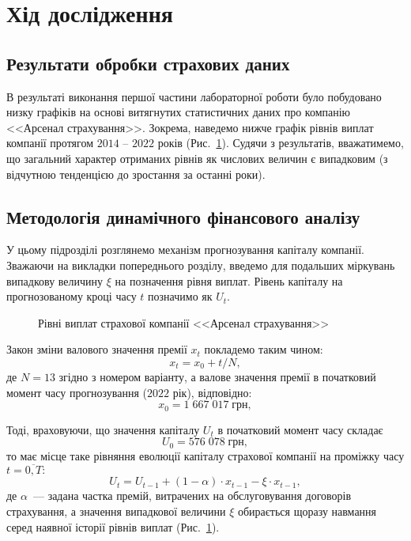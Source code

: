 \documentclass{mathreport}
\begin{document}
\section*{Хід дослідження}

\subsection{Результати обробки страхових даних}

В результаті виконання першої частини лабораторної роботи було побудовано низку графіків на основі витягнутих статистичних даних про компанію <<Арсенал страхування>>. Зокрема, наведемо нижче графік рівнів виплат компанії протягом $2014$ -- $2022$ років (Рис.~\ref{pic: annual payout levels}). Судячи з результатів, вважатимемо, що загальний характер отриманих рівнів як числових величин є випадковим (з відчутною тенденцією до зростання за останні роки).

\subsection{Методологія динамічного фінансового аналізу}

У цьому підрозділі розглянемо механізм прогнозування капіталу компанії. Зважаючи на викладки попереднього розділу, введемо для подальших міркувань випадкову величину $\xi$ на позначення рівня виплат. Рівень капіталу на прогнозованому кроці часу $t$ позначимо як $U_t$. 

\begin{figure}[H]\centering
    
    \caption{Рівні виплат страхової компанії <<Арсенал страхування>>}
    \label{pic: annual payout levels}
\end{figure}

Закон зміни валового значення премії $x_t$ покладемо таким чином:
\begin{equation}\label{eq: insurance premium}
    x_t = x_0 + t/N,
\end{equation}
де $N=13$ згідно з номером варіанту, а валове значення премії в початковий момент часу прогнозування ($2022$ рік), відповідно:
\begin{equation}\label{eq: insurance premium at the initial time}
    x_0 = 1\;667\;017\;\text{грн},
\end{equation} 

Тоді, враховуючи, що значення капіталу $U_t$ в початковий момент часу складає
\begin{equation}\label{eq: initial (2022) capital}
    U_0 = 576\;078\;\text{грн},
\end{equation}
то має місце таке рівняння еволюції капіталу страхової компанії на проміжку часу $t=\overline{0,T}:$
\begin{equation}\label{eq: capital}
    U_t = U_{t-1} + (1-\alpha) \cdot x_{t-1} - \xi \cdot x_{t-1},
\end{equation}
де $\alpha$~--- задана частка премій, витрачених на обслуговування договорів страхування, а значення випадкової величини $\xi$ обирається щоразу навмання серед наявної історії рівнів виплат (Рис.~\ref{pic: annual payout levels}). 
\end{document}
